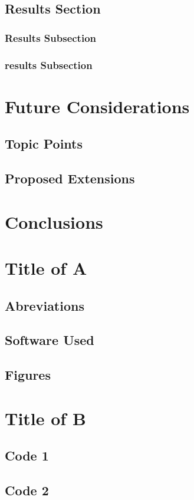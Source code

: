 \documentclass[a4paper,twoside,12pt]{book}
\begin{document}
			\section{Results Section}
				\subsection{Results Subsection}
				\subsection{results Subsection}	
		\chapter{Future Considerations} 
			\section{Topic Points}  \clearpage
			\section{Proposed Extensions} 
		\chapter{Conclusions} 
	
	\appendix
		\chapter{Title of A}
			\section{Abreviations} %
			\section{Software Used} %
			\section{Figures} %
		\chapter{Title of B}
			\section {Code 1}
			\section {Code 2}

	\backmatter
		
		

	
\end{document}
